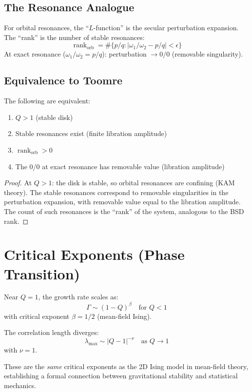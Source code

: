 \documentclass[11pt]{article}
\newcommand{\rank}{\operatorname{rank}}
\begin{document}
\subsection{The Resonance Analogue}

For orbital resonances, the ``$L$-function'' is the secular perturbation
expansion.  The ``rank'' is the number of stable resonances:
\[
  \rank_{\text{orb}} = \#\{p/q : |\omega_1/\omega_2 - p/q| < \epsilon\}
\]
At exact resonance ($\omega_1/\omega_2 = p/q$): perturbation $\to 0/0$
(removable singularity).

\subsection{Equivalence to Toomre}

\begin{theorem}
The following are equivalent:
\begin{enumerate}
\item $Q > 1$ (stable disk)
\item Stable resonances exist (finite libration amplitude)
\item $\rank_{\text{orb}} > 0$
\item The 0/0 at exact resonance has removable value (libration amplitude)
\end{enumerate}
\end{theorem}

\begin{proof}
At $Q > 1$: the disk is stable, so orbital resonances are confining
(KAM theory).  The stable resonances correspond to removable singularities
in the perturbation expansion, with removable value equal to the libration
amplitude.  The count of such resonances is the ``rank'' of the system,
analogous to the BSD rank.
\end{proof}

\section{Critical Exponents (Phase Transition)}

Near $Q = 1$, the growth rate scales as:
\[
  \Gamma \sim (1 - Q)^\beta \quad \text{for } Q < 1
\]
with critical exponent $\beta = 1/2$ (mean-field Ising).

The correlation length diverges:
\[
  \lambda_{\max} \sim |Q - 1|^{-\nu} \quad \text{as } Q \to 1
\]
with $\nu = 1$.

These are the \emph{same} critical exponents as the 2D Ising model in
mean-field theory, establishing a formal connection between gravitational
stability and statistical mechanics.
\end{document}
